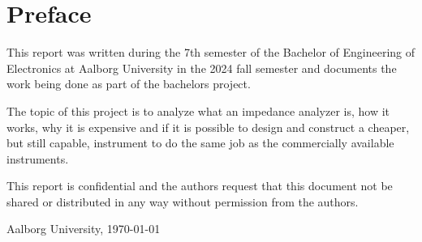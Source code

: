 \thispagestyle{empty}
\chapter*{Preface}\label{ch:preface}

This report was written during the 7th semester of the Bachelor of Engineering of Electronics at Aalborg University in the 2024 fall semester and documents the work being done as part of the bachelors project.

The topic of this project is to analyze what an impedance analyzer is, how it works, why it is expensive and if it is possible to design and construct a cheaper, but still capable, instrument to do the same job as the commercially available instruments.

This report is confidential and the authors request that this document not be shared or distributed in any way without permission from the authors.

\vspace{\baselineskip}\hfill Aalborg University, \today


